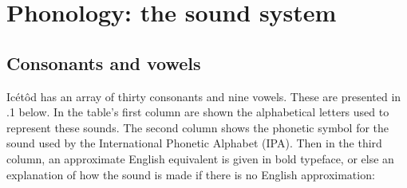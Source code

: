 \section{Phonology: the sound system}
 
\subsection{Consonants and vowels}


Icétôd has an array of thirty consonants\textsc{ }and nine vowels. These are presented in .1 below. In the table’s first column are shown the alphabetical letters used to represent these sounds. The second column shows the phonetic symbol for the sound used by the International Phonetic Alphabet (IPA). Then in the third column, an approximate English equivalent is given in bold typeface, or else an explanation of how the sound is made if there is no English approximation:


